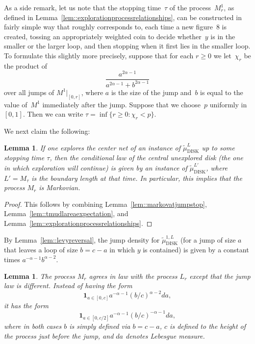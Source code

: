 \documentclass[10pt]{amsart}
\theoremstyle{plain}
\numberwithin{theorem}{section}
\newtheorem{lemma}[theorem]{Lemma}
\theoremstyle{definition}
\newcommand{\one}{{\mathbf 1}}
\newcommand{\tmudonel}{\wt{\mu}_{ \mathrm{DISK}}^{1, L}}
\newcommand{\tmudl}{\wt{\mu}_{\mathrm{DISK}}^L}
\def\tmudlset#1{\wt{\mu}_{\mathrm{DISK}}^{#1}}
\let\wt\widetilde
\begin{document}
As a side remark, let us note that the stopping time~$\tau$ of the process~$M_r^1$, as defined in Lemma~\ref{lem::explorationprocessrelationships}, can be constructed in fairly simple way that roughly corresponds to, each time a new figure~$8$ is created, tossing an appropriately weighted coin to decide whether~$y$ is in the smaller or the larger loop, and then stopping when it first lies in the smaller loop. To formulate this slightly more precisely, suppose that for each $r \geq 0$ we let~$\chi_r$ be the product of\vspace*{-3pt}\enlargethispage{.5\baselineskip}%
\[
\frac{a^{2\alpha-1}}{a^{2\alpha-1}+b^{2\alpha-1}}
\]
over all jumps of $M^1|_{[0,r]}$, where $a$ is the size of the jump and~$b$ is equal to the value of~$M^1$ immediately after the jump. Suppose that we choose~$p$ uniformly in $[0,1]$. Then we can write $\tau = \inf\{r \geq 0 : \chi_r < p\}$.

We next claim the following:
\begin{lemma}
\label{lem::mtmarkovian}
If one explores the center net of an instance of $\tmudl$ up to some stopping time $\tau$, then the conditional law of the central unexplored disk (\ie the one in which exploration will continue) is given by an instance of $\tmudlset{L'}$, where $L' = M_\tau$ is the boundary length at that time. In particular, this implies that the process $M_r$ is Markovian.
\end{lemma}
\begin{proof}
This follows by combining Lemma~\ref{lem::markovatjumpstop}, Lemma~\ref{lem::tmudlareaexpectation}, and Lemma~\ref{lem::explorationprocessrelationships}.
\end{proof}

By Lemma~\ref{lem::levyreversal}, the jump density for $\tmudonel$ (for a jump of size $a$ that leaves a loop of size $b = c-a$ in which $y$ is contained) is given by a constant times $a^{-\alpha-1} b^{\alpha - 2}$.

\begin{lemma}
\label{lem::mtjumplaw}
The process $M_r$ agrees in law with the process $L_r$ except that the jump law is different. Instead of having the form
\begin{equation}
\label{eqn::levy_jump_law}
\one_{a \in [0,c]} a^{-\alpha-1} (b/c)^{\alpha-2} da,
\end{equation}
it has the form
\begin{equation}
\label{eqn::firstradon}
\one_{a \in [0,c/2]} a^{-\alpha - 1} (b/c)^{-\alpha-1} da,
\end{equation}
where in both cases $b$ is simply defined via $b = c-a$, $c$ is defined to the height of the process just before the jump, and $da$ denotes Lebesgue measure.
\end{lemma}
\end{document}
